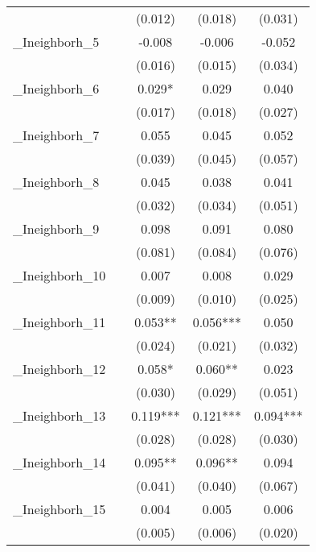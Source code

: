 {\begin{tabular}{l*{4}{c}}
          &            &  (0.012)   &  (0.018)   &  (0.031)   \\
\addlinespace
\_Ineighborh\_5&            &   -0.008   &   -0.006   &   -0.052   \\
          &            &  (0.016)   &  (0.015)   &  (0.034)   \\
\addlinespace
\_Ineighborh\_6&            &    0.029*  &    0.029   &    0.040   \\
          &            &  (0.017)   &  (0.018)   &  (0.027)   \\
\addlinespace
\_Ineighborh\_7&            &    0.055   &    0.045   &    0.052   \\
          &            &  (0.039)   &  (0.045)   &  (0.057)   \\
\addlinespace
\_Ineighborh\_8&            &    0.045   &    0.038   &    0.041   \\
          &            &  (0.032)   &  (0.034)   &  (0.051)   \\
\addlinespace
\_Ineighborh\_9&            &    0.098   &    0.091   &    0.080   \\
          &            &  (0.081)   &  (0.084)   &  (0.076)   \\
\addlinespace
\_Ineighborh\_10&            &    0.007   &    0.008   &    0.029   \\
          &            &  (0.009)   &  (0.010)   &  (0.025)   \\
\addlinespace
\_Ineighborh\_11&            &    0.053** &    0.056***&    0.050   \\
          &            &  (0.024)   &  (0.021)   &  (0.032)   \\
\addlinespace
\_Ineighborh\_12&            &    0.058*  &    0.060** &    0.023   \\
          &            &  (0.030)   &  (0.029)   &  (0.051)   \\
\addlinespace
\_Ineighborh\_13&            &    0.119***&    0.121***&    0.094***\\
          &            &  (0.028)   &  (0.028)   &  (0.030)   \\
\addlinespace
\_Ineighborh\_14&            &    0.095** &    0.096** &    0.094   \\
          &            &  (0.041)   &  (0.040)   &  (0.067)   \\
\addlinespace
\_Ineighborh\_15&            &    0.004   &    0.005   &    0.006   \\
          &            &  (0.005)   &  (0.006)   &  (0.020)   \\

\end{tabular}}
